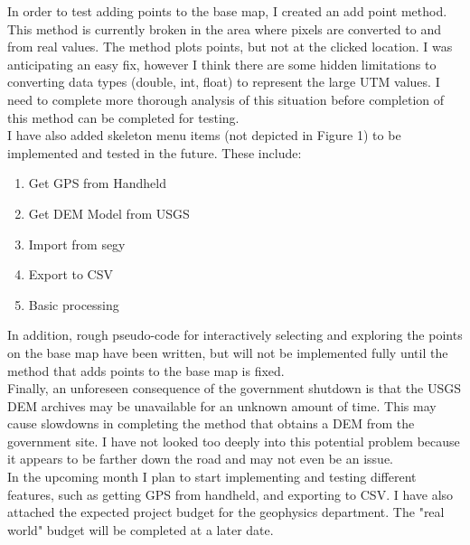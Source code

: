 \documentclass[a4paper,11pt]{texMemo}
\begin{document}
In order to test adding points to the base map, I created an add point method. This method is currently broken in the area where pixels are converted to and from real values. The method plots points, but not at the clicked location. I was anticipating an easy fix, however I think there are some hidden limitations to converting data types (double, int, float) to represent the large UTM values. I need to complete more thorough analysis of this situation before completion of this method can be completed for testing. \\

I have also added skeleton menu items (not depicted in Figure 1) to be implemented and tested in the future. These include:
\begin{enumerate}
\item Get GPS from Handheld
\item Get DEM Model from USGS
\item Import from segy
\item Export to CSV
\item Basic processing
\end{enumerate}

In addition, rough pseudo-code for interactively selecting and exploring the points on the base map have been written, but will not be implemented fully until the method that adds points to the base map is fixed. \\

Finally, an unforeseen consequence of the government shutdown is that the USGS DEM archives may be unavailable for an unknown amount of time. This may cause slowdowns in completing the method that obtains a DEM from the government site. I have not looked too deeply into this potential problem because it appears to be farther down the road and may not even be an issue. \\

In the upcoming month I plan to start implementing and testing different features, such as getting GPS from handheld, and exporting to CSV. I have also attached the expected project budget for the geophysics department. The "real world" budget will be completed at a later date. \\
\end{document}
